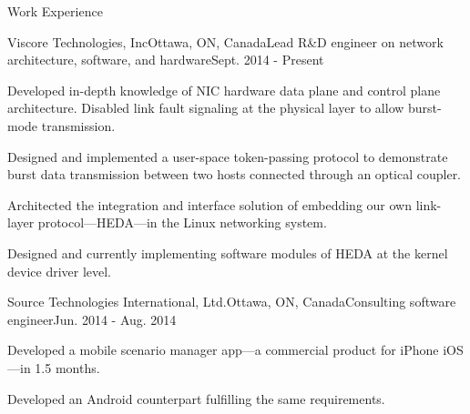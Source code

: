 \documentclass{resume} %
\begin{document}

\begin{rSection}{Work Experience}

\begin{rSubsection}{Viscore Technologies, Inc}{Ottawa, ON, Canada}{Lead R\&D engineer on network architecture, software, and hardware}{Sept. 2014 - Present}
\item Developed in-depth knowledge of NIC hardware data plane and control plane architecture. Disabled link fault signaling at the physical layer to allow burst-mode transmission.
\item Designed and implemented a user-space token-passing protocol to demonstrate burst data transmission between two hosts connected through an optical coupler.
\item Architected the integration and interface solution of embedding our own link-layer protocol---HEDA---in the Linux networking system.
\item Designed and currently implementing software modules of HEDA at the kernel device driver level.
\end{rSubsection}


\begin{rSubsection}{Source Technologies International, Ltd.}{Ottawa, ON, Canada}{Consulting software engineer}{Jun. 2014 - Aug. 2014}
\item Developed a mobile scenario manager app---a commercial product for iPhone iOS---in 1.5 months.
\item Developed an Android counterpart fulfilling the same requirements.
\end{rSubsection}

\end{rSection}
\end{document}
